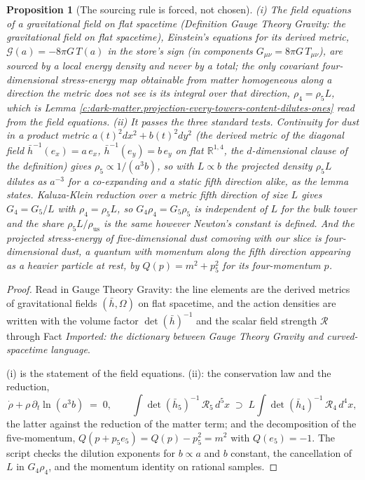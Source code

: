 \documentclass[11pt]{article}
\newtheorem{proposition}[theorem]{Proposition}
\theoremstyle{definition}
\theoremstyle{plain}
\newcommand{\changedmark}[2]{\marginpar{\raggedright\scriptsize\color{#1}#2}}
\providecommand{\R}{}\renewcommand{\R}{\mathbb{R}}
\providecommand{\hb}{}\renewcommand{\hb}{\bar{h}}
\begin{document}
\begin{proposition}[The sourcing rule is forced, not chosen]\label{c:dark-matter.sourcing-rule-forced-not-chosen}
\changedmark{BurntOrange}{changed since the deposit}
(i) The field equations of a gravitational field on flat spacetime (Definition \emph{Gauge Theory Gravity: the gravitational field on flat spacetime}), Einstein's equations for its derived metric, $\mathcal{G}(a) = -8\pi G\, T(a)$ in the store's sign (in components $G_{\mu\nu} = 8\pi G\,T_{\mu\nu}$), are sourced by a local energy density and never by a total; the only covariant four-dimensional stress-energy map obtainable from matter homogeneous along a direction the metric does not see is its integral over that direction, $\rho_{4} = \rho_{5}L$, which is Lemma \ref{c:dark-matter.projection-every-towers-content-dilutes-ones} read from the field equations. (ii) It passes the three standard tests. Continuity for dust in a product metric $a(t)^{2}dx^{2} + b(t)^{2}dy^{2}$ (the derived metric of the diagonal field $\hb^{-1}(e_x) = a\,e_x$, $\hb^{-1}(e_y) = b\,e_y$ on flat $\R^{1,4}$, the $d$-dimensional clause of the definition) gives $\rho_{5} \propto 1/(a^{3}b)$, so with $L \propto b$ the projected density $\rho_{5}L$ dilutes as $a^{-3}$ for a co-expanding and a static fifth direction alike, as the lemma states. Kaluza-Klein reduction over a metric fifth direction of size $L$ gives $G_{4} = G_{5}/L$ with $\rho_{4} = \rho_{5}L$, so $G_{4}\rho_{4} = G_{5}\rho_{5}$ is independent of $L$ for the bulk tower and the share $\rho_{5}L/\rho_{\mathrm{us}}$ is the same however Newton's constant is defined. And the projected stress-energy of five-dimensional dust comoving with our slice is four-dimensional dust, a quantum with momentum along the fifth direction appearing as a heavier particle at rest, by $Q(p) = m^{2} + p_{5}^{2}$ for its four-momentum $p$.
\end{proposition}
\begin{proof}
Read in Gauge Theory Gravity: the line elements are the derived metrics of gravitational fields $(\hb, \Omega)$ on flat spacetime, and the action densities are written with the volume factor $\det(\hb)^{-1}$ and the scalar field strength $\mathcal{R}$ through Fact \emph{Imported: the dictionary between Gauge Theory Gravity and curved-spacetime language}.

(i) is the statement of the field equations. (ii): the conservation law and the reduction,
\[
\dot\rho + \rho\,\partial_{t}\ln(a^{3}b) \;=\; 0, \qquad \int\det(\hb_{5})^{-1}\,\mathcal{R}_{5}\,d^{5}x \;\supset\; L\int\det(\hb_{4})^{-1}\,\mathcal{R}_{4}\,d^{4}x,
\]
the latter against the reduction of the matter term; and the decomposition of the five-momentum, $Q(p + p_{5}e_{5}) = Q(p) - p_{5}^{2} = m^{2}$ with $Q(e_5) = -1$. The script checks the dilution exponents for $b \propto a$ and $b$ constant, the cancellation of $L$ in $G_{4}\rho_{4}$, and the momentum identity on rational samples.

\end{proof}
\end{document}

